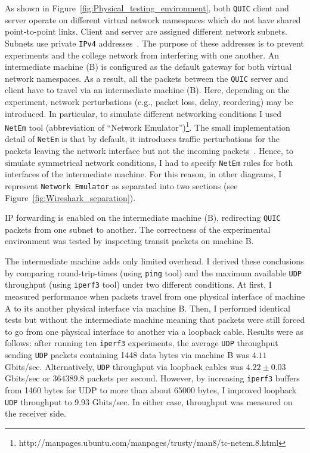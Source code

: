 \documentclass[12pt,a4paper]{report}
\begin{document}
    As shown in Figure~\ref{fig:Physical_testing_environment}, both \texttt{QUIC} client and server operate on different virtual network namespaces which do not have shared point-to-point links.
    Client and server are assigned different network subnets.
    Subnets use private \texttt{IPv4} addresses~\cite{rfc1918}.
    The purpose of these addresses is to prevent experiments and the college network from interfering with one another.
    An intermediate machine (B) is configured as the default gateway for both virtual network namespaces.
    As a result, all the packets between the \texttt{QUIC} server and client have to travel via an intermediate machine (B).
    Here, depending on the experiment, network perturbations (e.g., packet loss, delay, reordering) may be introduced.
    In particular, to simulate different networking conditions I used \texttt{NetEm} tool (abbreviation of \enquote{Network Emulator})\footnote{http://manpages.ubuntu.com/manpages/trusty/man8/tc-netem.8.html}.
    The small implementation detail of \texttt{NetEm} is that by default, it introduces traffic perturbations for the packets leaving the network interface but not the incoming packets~\cite{Ubuntu_Manpage_NetEm}.
    Hence, to simulate symmetrical network conditions, I had to specify \texttt{NetEm} rules for both interfaces of the intermediate machine.
    For this reason, in other diagrams, I represent \texttt{Network Emulator} as separated into two sections (see Figure~\ref{fig:Wireshark_separation}).
    
    
    IP forwarding is enabled on the intermediate machine (B), redirecting \texttt{QUIC} packets from one subnet to another.
    The correctness of the experimental environment was tested by inspecting transit packets on machine B.



    The intermediate machine adds only limited overhead.
    I derived these conclusions by comparing round-trip-times (using \texttt{ping} tool) and the maximum available \texttt{UDP} throughput (using \texttt{iperf3} tool) under two different conditions.
    At first, I measured performance when packets travel from one physical interface of machine A to its another physical interface via machine B.
    Then, I performed identical tests but without the intermediate machine meaning that packets were still forced to go from one physical interface to another via a loopback cable.
    Results were as follows: after running ten \texttt{iperf3} experiments, the average \texttt{UDP} throughput sending \texttt{UDP} packets containing 1448 data bytes via machine B was $4.11$ Gbits/sec.
    Alternatively, \texttt{UDP} throughput via loopback cables was $4.22 \pm 0.03$ Gbits/sec or $364389.8$ packets per second.
    However, by increasing \texttt{iperf3} buffers from 1460 bytes for UDP to more than about 65000 bytes, I improved loopback \texttt{UDP} throughput to 9.93 Gbits/sec.
    In either case, throughput was measured on the receiver side.
    
\end{document}
